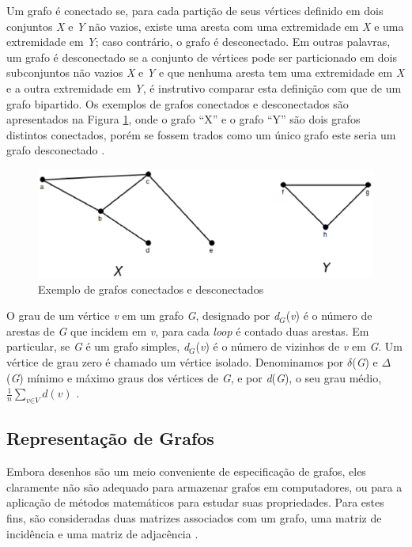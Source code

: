Um grafo é conectado se, para cada partição de seus vértices definido em dois conjuntos \textit{X} e \textit{Y} não vazios, existe uma aresta com uma extremidade em \textit{X} e uma extremidade em \textit{Y}; caso contrário, o grafo é desconectado. Em outras palavras, um grafo é desconectado se a conjunto de vértices pode ser particionado em dois subconjuntos não vazios \textit{X} e \textit{Y} e que nenhuma aresta tem uma extremidade em \textit{X} e a outra extremidade em \textit{Y}, é instrutivo comparar esta definição com que de um grafo bipartido. Os exemplos de grafos conectados e desconectados são apresentados na Figura \ref{desconectados}, onde o grafo ``X'' e o grafo ``Y'' são dois grafos distintos conectados, porém se fossem trados como um único grafo este seria um grafo desconectado \cite{Bondy:2007}.

\begin{figure}[!h]
	\centering
	\includegraphics[scale=0.45]{figuras/capitulo2/desconectados.eps}
	\caption{Exemplo de grafos conectados e desconectados}
	\label{desconectados}
\end{figure}

O grau de um vértice \textit{v} em um grafo \textit{G}, designado por \textit{d$_G$}(\textit{v}) é o número de arestas de \textit{G} que incidem em \textit{v}, para cada \textit{loop} é contado duas arestas. Em particular, se \textit{G} é um grafo simples, \textit{d$_G$}(\textit{v}) é o número de vizinhos de \textit{v} em \textit{G}. Um vértice de grau zero é chamado um vértice isolado. Denominamos por $\delta$(\textit{G}) e $\Delta$(\textit{G}) mínimo e máximo graus dos vértices de \textit{G}, e por \textit{d}(\textit{G}), o seu grau médio, $\frac{1}{n}\sum_{\textit{v}\in\textit{V}} \textit{d}(\textit{v})$ \cite{Diestel:1997}.	

\subsection{Representação de Grafos}

Embora desenhos são um meio conveniente de especificação de grafos, eles claramente não são adequado para armazenar grafos em computadores, ou para a aplicação de métodos matemáticos para estudar suas propriedades. Para estes fins, são consideradas duas matrizes associados com um grafo, uma matriz de incidência e uma matriz de adjacência \cite{Bondy:2007}.

